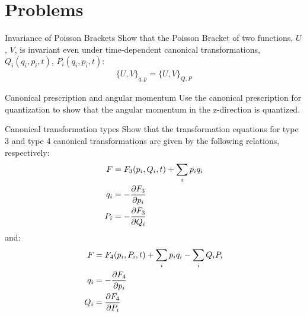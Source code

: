%
\section{Problems}

\begin{problem}{Invariance of Poisson Brackets} Show that the Poisson Bracket of two functions, $U$, $V$, is invariant even under time-dependent canonical transformations, $Q_i(q_i,p_i,t)$, $P_i(q_i,p_i,t)$:
\begin{align*}
\{U,V\}_{q,p}=\{U,V\}_{Q,P}
\end{align*}
\label{prob_CT_1}
\end{problem}

\begin{problem}{Canonical prescription and angular momentum}
Use the canonical prescription for quantization to show that the angular momentum in the z-direction is quantized.
\label{prob_CT_2}
\end{problem}

\begin{problem}{Canonical transformation types}
Show that the transformation equations for type 3 and type 4 canonical transformations are given by the following relations, respectively:
\begin{align*}
F&=F_3(p_i,Q_i,t)+\sum_ip_iq_i \\
q_i&=-\frac{\partial F_3}{\partial p_i}\\
P_i&=-\frac{\partial F_3}{\partial Q_i}
\end{align*}
and:
\begin{align*}
F&=F_4(p_i,P_i,t)+\sum_ip_iq_i-\sum_iQ_iP_i\\
q_i&=-\frac{\partial F_4}{\partial p_i}\\
Q_i&=\frac{\partial F_4}{\partial P_i}
\end{align*}
\label{prob_CT_3}
\end{problem}

